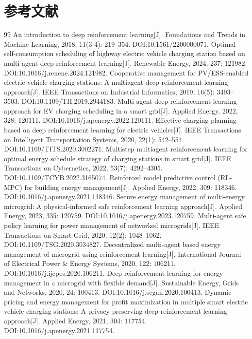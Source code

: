 \documentclass[UTF8,a4paper,11pt]{ctexart}
\begin{document}
\section*{参考文献}
\begin{thebibliography}{99}\small
{} An introduction to deep reinforcement learning[J]. Foundations and Trends in Machine Learning, 2018, 11(3-4): 219--354. DOI:10.1561/2200000071.
 Optimal self-consumption scheduling of highway electric vehicle charging station based on multi-agent deep reinforcement learning[J]. Renewable Energy, 2024, 237: 121982. DOI:10.1016/j.renene.2024.121982.
 Cooperative management for PV/ESS-enabled electric vehicle charging stations: A multiagent deep reinforcement learning approach[J]. IEEE Transactions on Industrial Informatics, 2019, 16(5): 3493--3503. DOI:10.1109/TII.2019.2944183.
 Multi-agent deep reinforcement learning approach for EV charging scheduling in a smart grid[J]. Applied Energy, 2022, 328: 120111. DOI:10.1016/j.apenergy.2022.120111.
 Effective charging planning based on deep reinforcement learning for electric vehicles[J]. IEEE Transactions on Intelligent Transportation Systems, 2020, 22(1): 542--554. DOI:10.1109/TITS.2020.3002271.
 Multistep multiagent reinforcement learning for optimal energy schedule strategy of charging stations in smart grid[J]. IEEE Transactions on Cybernetics, 2022, 53(7): 4292--4305. DOI:10.1109/TCYB.2022.3165074.
 Reinforced model predictive control (RL-MPC) for building energy management[J]. Applied Energy, 2022, 309: 118346. DOI:10.1016/j.apenergy.2021.118346.
 Secure energy management of multi-energy microgrid: A physical-informed safe reinforcement learning approach[J]. Applied Energy, 2023, 335: 120759. DOI:10.1016/j.apenergy.2023.120759.
 Multi-agent safe policy learning for power management of networked microgrids[J]. IEEE Transactions on Smart Grid, 2020, 12(2): 1048--1062. DOI:10.1109/TSG.2020.3034827.
 Decentralized multi-agent based energy management of microgrid using reinforcement learning[J]. International Journal of Electrical Power \& Energy Systems, 2020, 122: 106211. DOI:10.1016/j.ijepes.2020.106211.
 Deep reinforcement learning for energy management in a microgrid with flexible demand[J]. Sustainable Energy, Grids and Networks, 2020, 24: 100413. DOI:10.1016/j.segan.2020.100413.
 Dynamic pricing and energy management for profit maximization in multiple smart electric vehicle charging stations: A privacy-preserving deep reinforcement learning approach[J]. Applied Energy, 2021, 304: 117754. DOI:10.1016/j.apenergy.2021.117754.

\end{thebibliography}
\end{document}
